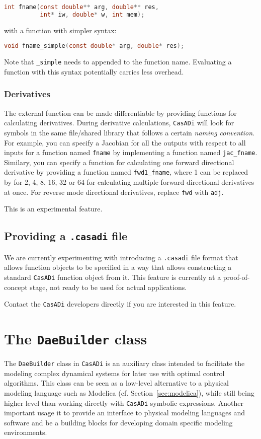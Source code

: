 \documentclass[a4paper,12pt]{book}
\newcommand{\CasADi}{\texttt{CasADi}\xspace}
\begin{document}
\begin{lstlisting}[language=C]
int fname(const double** arg, double** res,
          int* iw, double* w, int mem);
\end{lstlisting}

with a function with simpler syntax:
\begin{lstlisting}[language=C]
void fname_simple(const double* arg, double* res);
\end{lstlisting}

Note that \verb|_simple| needs to appended to the function name. Evaluating
a function with this syntax potentially carries less overhead.

\subsection*{Derivatives}
The external function can be made differentiable by providing functions for
calculating derivatives. During derivative calculations, \CasADi will look for
symbols in the same file/shared library that follows a certain
\emph{naming convention}. For example, you can specify a Jacobian for all the
outputs with respect to all inputs for a function named \verb|fname| by
implementing a function named \verb|jac_fname|. Similary, you can specify
a function for calculating one forward directional derivative by providing a
function named \verb|fwd1_fname|, where 1 can be replaced by for 2, 4, 8, 16,
32 or 64 for calculating multiple forward directional derivatives at once.
For reverse mode directional derivatives, replace \verb|fwd| with \verb|adj|.

This is an experimental feature.

\section{Providing a \texttt{.casadi} file}
We are currently experimenting with introducing a \texttt{.casadi} file format
that allows function objects to be specified in a way that allows constructing
a standard \CasADi function object from it. This feature is currently at
a proof-of-concept stage, not ready to be used for actual applications.

Contact the \CasADi developers directly if you are interested in this feature.

\chapter{The \texttt{DaeBuilder} class} \label{ch:daebuilder}
The \texttt{DaeBuilder} class in \CasADi is an auxiliary class intended to
facilitate the modeling complex dynamical systems for later use with optimal
control algorithms. This class can be seen as a low-level alternative to
a physical modeling language such as Modelica (cf. Section~\ref{sec:modelica}),
while still being higher level than working directly with \CasADi symbolic
expressions. Another important usage it to provide an interface to
physical modeling languages and software and be a building blocks for
developing domain specific modeling environments.
\end{document}

